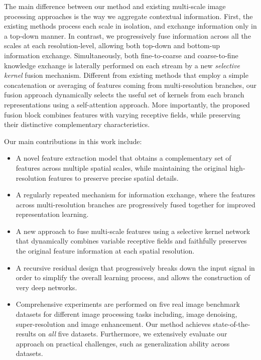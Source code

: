 \documentclass[runningheads]{llncs}
\begin{document}
The main difference between our method and existing multi-scale image processing approaches is the way we aggregate contextual information. 
First, the existing methods \cite{tao2018scale,nah2017,gu2019self} process each scale in isolation, and exchange information only in a  top-down manner. In contrast, we progressively fuse information across all the scales at each resolution-level, allowing both top-down and bottom-up information exchange. 
Simultaneously, both fine-to-coarse and coarse-to-fine knowledge exchange is laterally performed on each stream by a new \emph{selective kernel} fusion mechanism. Different from existing methods that employ a simple concatenation or averaging of features coming from multi-resolution branches, our fusion approach dynamically selects the useful set of kernels from each branch representations using a self-attention approach. 
More importantly, the proposed fusion block combines features with varying receptive fields, while preserving their distinctive complementary characteristics.

\noindent Our main contributions in this work include:\vspace{-0.5em}
\begin{itemize}
\item A novel feature extraction model that obtains a complementary set of features across multiple spatial scales, while maintaining the original high-resolution features to preserve precise spatial details. 
\item A regularly repeated mechanism for information exchange, where the features across multi-resolution branches are progressively fused together for improved representation learning.
\item A new approach to fuse multi-scale features using a selective kernel network that dynamically combines variable receptive fields and faithfully preserves the original feature information at each spatial resolution. 
\item A recursive residual design that progressively breaks down the input signal in order to simplify the overall learning process, and allows the construction of very deep networks. 
\item Comprehensive experiments are performed on five real image benchmark datasets for different image processing tasks including, image denoising, super-resolution and image enhancement. Our method achieves state-of-the-results on \textit{all} five datasets. Furthermore, we extensively evaluate our approach on practical challenges, such as generalization ability across datasets.
\end{itemize}
\end{document}
